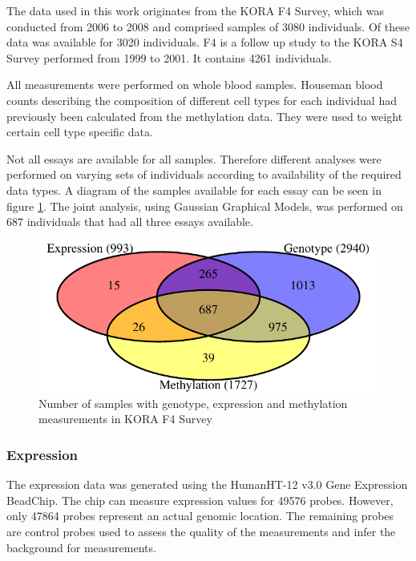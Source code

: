 \documentclass[a4paper,12pt,twoside,openright]{article}
\begin{document}
The data used in this work originates from the KORA F4 Survey, which was conducted from 2006 to 2008 and comprised samples of 3080 individuals. Of these data was available for 3020 individuals. F4 is a follow up study to the KORA S4 Survey performed from 1999 to 2001. It contains 4261 individuals. 

All measurements were performed on whole blood samples. Houseman blood counts\cite{10.3389/fgene.2016.00023} describing the composition of different cell types for each individual had previously been calculated from the methylation data. They were used to weight certain cell type specific data. 

Not all essays are available for all samples. Therefore different analyses were performed on varying sets of individuals according to availability of the required data types. A diagram of the samples available for each essay can be seen in figure \ref{fig:samples.venn}. The joint analysis, using Gaussian Graphical Models, was performed on 687 individuals that had all three essays available. 
\begin{figure}[tb]
\begin{center}
	\includegraphics[scale = 1, keepaspectratio = true]{../figures/samples_venn}  
	\caption{Number of samples with genotype, expression and methylation measurements in KORA F4 Survey}
    \label{fig:samples.venn}
\end{center}
\end{figure}

\subsubsection{Expression}
\label{Data:Expression}
The expression data was generated using the HumanHT-12 v3.0 Gene Expression BeadChip. The chip can measure expression values for 49576 probes. However, only 47864 probes represent an actual genomic location. The remaining probes are control probes used to assess the quality of the measurements and infer the background for measurements. 
\end{document}
